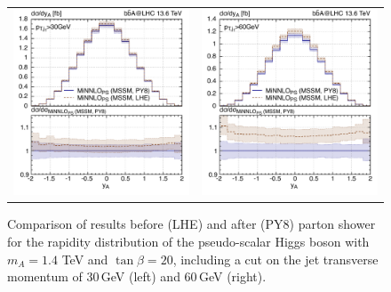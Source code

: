 \documentclass[11pt,a4paper]{article}
\begin{document}
\begin{figure}[t!]
\begin{center}
\begin{tabular}{cc}
\includegraphics[width=.45\textwidth, page=1]{plots/5fs/BSM/y_H-ptj30__A-1400GeV-.pdf}&
\includegraphics[width=.45\textwidth, page=1]{plots/5fs/BSM/y_H-ptj60__A-1400GeV-.pdf}
\end{tabular}
\vspace*{1ex}
\caption{Comparison of \minnlo{} results before (LHE) and after (PY8) parton shower for the rapidity distribution of the pseudo-scalar Higgs boson 
 with $m_A=1.4$ TeV and $\tan\beta=20$, including a cut on the jet transverse momentum of 30\,GeV (left) and 60\,GeV (right). \label{fig:yA}}
\end{center}
\end{figure}
\end{document}
